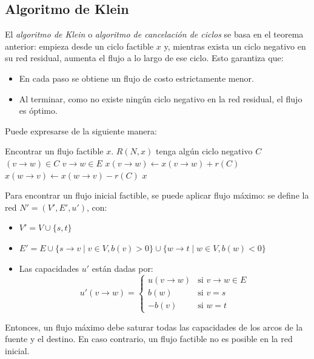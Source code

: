 \documentclass[a4paper]{report}
\newcommand{\si}{\text{si }}
\newcommand{\Each}{\kw{each}\ }
\begin{document}
\subsection{Algoritmo de Klein}

El \textit{algoritmo de Klein} o \textit{algoritmo de cancelación de ciclos} se basa en el teorema anterior: empieza desde un ciclo factible $x$ y, mientras exista un ciclo negativo en su red residual, aumenta el flujo a lo largo de ese ciclo. Esto garantiza que:
\begin{itemize}
    \item En cada paso se obtiene un flujo de costo estrictamente menor.
    \item Al terminar, como no existe ningún ciclo negativo en la red residual, el flujo es óptimo.
\end{itemize}

Puede expresarse de la siguiente manera:

\begin{codebox}
    \li Encontrar un flujo factible $x$.
    \li \While $R(N, x)$ tenga algún ciclo negativo $C$ \Do
    \li \For \Each $(v \rightarrow w) \in C$ \Do
    \li \If $v \rightarrow w \in E$ \Then
    \li $x(v \rightarrow w) \gets x(v \rightarrow w) + r(C)$
    \li \Else
    \li $x(w \rightarrow v) \gets x(w \rightarrow v) - r(C)$
    \End
    \End
    \End
    \Return $x$
\end{codebox}

Para encontrar un flujo inicial factible, se puede aplicar flujo máximo: se define la red $N' = (V', E', u')$, con:
\begin{itemize}
    \item $V' = V \cup \{s, t\}$
    \item $E' = E \cup \{s \rightarrow v \mid v \in V, b(v) > 0\} \cup \{w \rightarrow t \mid w \in V, b(w) < 0\}$
    \item Las capacidades $u'$ están dadas por:
          $$
              u'(v \rightarrow w) =
              \begin{cases}
                  u(v \rightarrow w) & \si v \rightarrow w \in E \\
                  b(w)               & \si v = s                 \\
                  -b(v)              & \si w = t
              \end{cases}
          $$
\end{itemize}

Entonces, un flujo máximo debe saturar todas las capacidades de los arcos de la fuente y el destino. En caso contrario, un flujo factible no es posible en la red inicial. %
\end{document}
